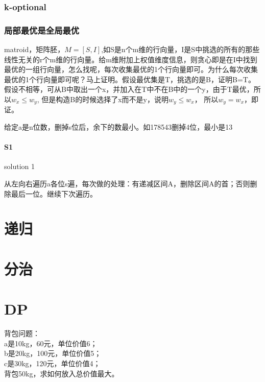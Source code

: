 \documentclass[UTF8]{../computerUniverse}
\begin{document}
\subsubsection{k-optional}




\subsubsection{局部最优是全局最优}

matroid，矩阵胚，$M = [S,I]$,如S是n个m维的行向量，I是S中挑选的所有的那些线性无关的r个m维的行向量。给m维附加上权值维度信息，则贪心即是在I中找到最优的一组行向量，怎么找呢，每次收集最优的1个行向量即可。为什么每次收集最优的1个行向量即可呢？马上证明。假设最优集是T，挑选的是B，证明B=T。假设不相等，可从B中取出一个x，并加入在T中不在B中的一个y，由于T最优，所以$w_x \leqslant w_y$, 但是构造B的时候选择了x而不是y，说明$w_y \leqslant w_x$， 所以$w_y = w_x$，即证。


\begin{question}
  给定a是n位数，删掉s位后，余下的数最小。如178543删掉4位，最小是13
 
   \paragraph{S1} solution 1

   从左向右遍历a各位s遍，每次做的处理：有递减区间A，删除区间A的首；否则删除最后一位。继续下次遍历。

 
 \end{question}





\section{递归}

\section{分治}

\section{DP}

背包问题：\\
a是10kg，60元，单位价值6；\\
b是20kg，100元，单位价值5；\\
c是30kg，120元，单位价值4；\\
背包50kg，求如何放入总价值最大。
\end{document}
